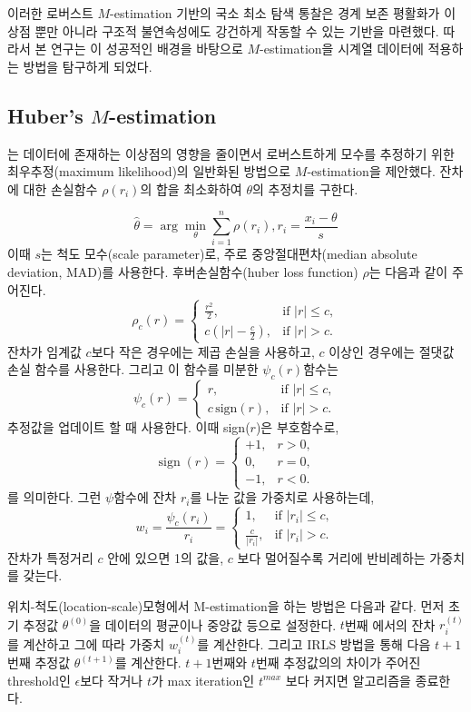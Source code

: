\documentclass[letterpaper,12pt]{article}
\begin{document}
{이러한 로버스트 $M$-estimation 기반의 국소 최소 탐색 통찰은 경계 보존 평활화가 이상점 뿐만 아니라 구조적 불연속성에도 강건하게 작동할 수 있는 기반을 마련했다. 따라서 본 연구는 이 성공적인 배경을 바탕으로 $M$-estimation을 시계열 데이터에 적용하는 방법을 탐구하게 되었다.

\subsection{Huber's $M$-estimation}\label{sec:setup}


\citet{huber1981robust}는 데이터에 존재하는 이상점의 영향을 줄이면서 로버스트하게 모수를 추정하기 위한 최우추정(maximum likelihood)의 일반화된 방법으로 $M$-estimation을 제안했다.  잔차에 대한 손실함수 $\rho(r_i)$의 합을 최소화하여 $\theta$의 추정치를 구한다. 

\[
\hat{\theta} = \arg\min_{\theta} \sum_{i=1}^n \rho(r_i),       r_i=\frac{x_i-\theta}{s}
\]
이때 $s$는 척도 모수(scale parameter)로, 주로 중앙절대편차(median absolute deviation, MAD)를 사용한다. 후버손실함수(huber loss function) $\rho$는 다음과 같이 주어진다.
\[
\rho_c(r) =
\begin{cases} 
\frac{r^2}{2}, & \text{if } |r| \leq c, \\ 
c \left( |r| - \frac{c}{2} \right), & \text{if } |r| > c.
\end{cases}
\]
잔차가 임계값 $c$보다 작은 경우에는 제곱 손실을 사용하고, $c$ 이상인 경우에는 절댓값 손실 함수를 사용한다. 그리고 이 함수를 미분한 $\psi_c(r)$함수는 
 \[
\psi_c(r) =
\begin{cases} 
r, & \text{if } |r| \leq c, \\ 
c \, \mathrm{sign}(r), & \text{if } |r| > c.
\end{cases}
\]
추정값을 업데이트 할 때 사용한다. 이때 sign($r$)은 부호함수로, 
\[
\operatorname{sign}(r) =
\begin{cases}
+1, & r>0,\\
0,  & r=0,\\
-1, & r<0.
\end{cases}
\]
를 의미한다.
그런 $\psi$함수에 잔차 $r_i$를 나눈 값을 가중치로 사용하는데,
 \[
w_i = \frac{\psi_c(r_i)}{r_i} =
\begin{cases} 
1, & \text{if } |r_i| \leq c, \\ 
\frac{c}{|r_i|}, & \text{if } |r_i| > c.
\end{cases}
\]
잔차가 특정거리 $c$ 안에 있으면 1의 값을, $c$ 보다 멀어질수록 거리에 반비례하는 가중치를 갖는다. 

위치-척도(location-scale)모형에서 M-estimation을 하는 방법은 다음과 같다. 먼저 초기 추정값 $\theta^{(0)}$을 데이터의 평균이나 중앙값 등으로 설정한다. $t$번째 에서의 잔차 $r_i^{(t)}$를 계산하고 그에 따라 가중치 $w_i^{(t)}$를 계산한다. 그리고 IRLS 방법을 통해 다음 $t+1$번째 추정값 $\theta^{(t+1)}$를 계산한다. $t+1$번째와 $t$번째 추정값의의 차이가 주어진 threshold인 $\epsilon$보다 작거나 $t$가 max iteration인 $t^{max}$ 보다 커지면 알고리즘을 종료한다.


}
\end{document}
